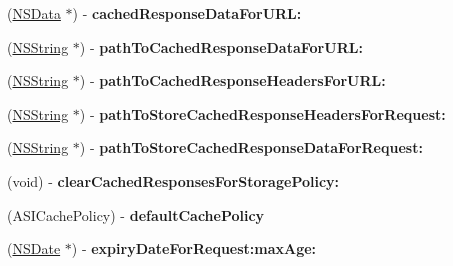 \begin{DoxyCompactItemize}
\item 
\hypertarget{protocol_a_s_i_cache_delegate-p_a24c0d2a6834e5a0332f3d95198fc681c}{
(\hyperlink{class_n_s_data}{\-N\-S\-Data} $\ast$) -\/ {\bfseries cached\-Response\-Data\-For\-U\-R\-L\-:}}
\label{protocol_a_s_i_cache_delegate-p_a24c0d2a6834e5a0332f3d95198fc681c}

\item 
\hypertarget{protocol_a_s_i_cache_delegate-p_a692463be3a5c9abe5a239eb761431799}{
(\hyperlink{class_n_s_string}{\-N\-S\-String} $\ast$) -\/ {\bfseries path\-To\-Cached\-Response\-Data\-For\-U\-R\-L\-:}}
\label{protocol_a_s_i_cache_delegate-p_a692463be3a5c9abe5a239eb761431799}

\item 
\hypertarget{protocol_a_s_i_cache_delegate-p_a0cab288cf23b1d6adb76981ed591d324}{
(\hyperlink{class_n_s_string}{\-N\-S\-String} $\ast$) -\/ {\bfseries path\-To\-Cached\-Response\-Headers\-For\-U\-R\-L\-:}}
\label{protocol_a_s_i_cache_delegate-p_a0cab288cf23b1d6adb76981ed591d324}

\item 
\hypertarget{protocol_a_s_i_cache_delegate-p_ab9a190279d92a9fc5d7efeff1efad0ad}{
(\hyperlink{class_n_s_string}{\-N\-S\-String} $\ast$) -\/ {\bfseries path\-To\-Store\-Cached\-Response\-Headers\-For\-Request\-:}}
\label{protocol_a_s_i_cache_delegate-p_ab9a190279d92a9fc5d7efeff1efad0ad}

\item 
\hypertarget{protocol_a_s_i_cache_delegate-p_ab7f2a212c2d6391b1d9fb7a8da9f2c39}{
(\hyperlink{class_n_s_string}{\-N\-S\-String} $\ast$) -\/ {\bfseries path\-To\-Store\-Cached\-Response\-Data\-For\-Request\-:}}
\label{protocol_a_s_i_cache_delegate-p_ab7f2a212c2d6391b1d9fb7a8da9f2c39}

\item 
\hypertarget{protocol_a_s_i_cache_delegate-p_abb2c511be4be2274bd3e812ea978e2a6}{
(void) -\/ {\bfseries clear\-Cached\-Responses\-For\-Storage\-Policy\-:}}
\label{protocol_a_s_i_cache_delegate-p_abb2c511be4be2274bd3e812ea978e2a6}

\item 
\hypertarget{protocol_a_s_i_cache_delegate-p_a1207aea079945294e7bb48c621d82a67}{
(\-A\-S\-I\-Cache\-Policy) -\/ {\bfseries default\-Cache\-Policy}}
\label{protocol_a_s_i_cache_delegate-p_a1207aea079945294e7bb48c621d82a67}

\item 
\hypertarget{protocol_a_s_i_cache_delegate-p_a36d0b83c9017dba94a93acc3cae9aa65}{
(\hyperlink{class_n_s_date}{\-N\-S\-Date} $\ast$) -\/ {\bfseries expiry\-Date\-For\-Request\-:max\-Age\-:}}
\label{protocol_a_s_i_cache_delegate-p_a36d0b83c9017dba94a93acc3cae9aa65}


\end{DoxyCompactItemize}
